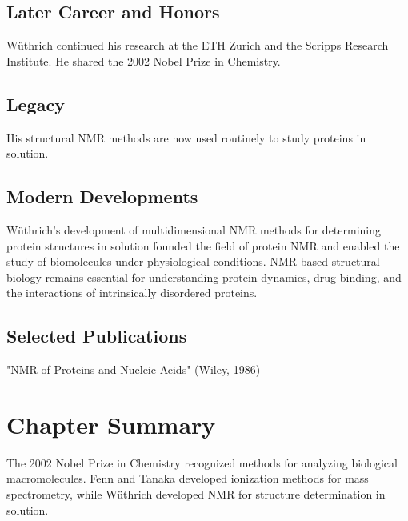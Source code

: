\subsection*{Later Career and Honors}

Wüthrich continued his research at the ETH Zurich and the Scripps Research Institute. He shared the 2002 Nobel Prize in Chemistry.

\subsection*{Legacy}

His structural NMR methods are now used routinely to study proteins in solution.

\subsection*{Modern Developments}

Wüthrich's development of multidimensional NMR methods for determining protein structures in solution founded the field of protein NMR and enabled the study of biomolecules under physiological conditions. NMR-based structural biology remains essential for understanding protein dynamics, drug binding, and the interactions of intrinsically disordered proteins.

\subsection*{Selected Publications}

"NMR of Proteins and Nucleic Acids" (Wiley, 1986)

\clearpage

\section*{Chapter Summary}

The 2002 Nobel Prize in Chemistry recognized methods for analyzing biological macromolecules. Fenn and Tanaka developed ionization methods for mass spectrometry, while Wüthrich developed NMR for structure determination in solution.
